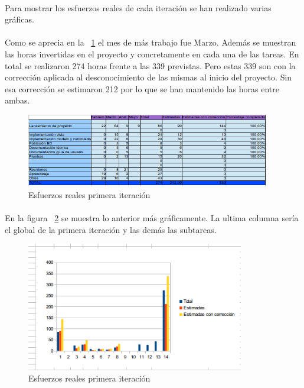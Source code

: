 
\paragraph{} Para mostrar los esfuerzos reales de cada iteración se han realizado varias gráficas.

\paragraph{} Como se aprecia en la ~\cref{fig:6161} el mes de más trabajo fue Marzo. Además se muestran las horas invertidas en el proyecto y concretamente en cada una de las tareas. En total se realizaron 274 horas frente a las 339 previstas. Pero estas 339 son con la corrección aplicada al desconocimiento de las mismas al inicio del proyecto. Sin esa corrección se estimaron 212 por lo que se han mantenido las horas entre ambas.

\begin{figure}[h!]
\centering
\includegraphics[width=0.95\textwidth]{img/6161}
\caption{Esfuerzos reales primera iteración}
 \label{fig:6161}
\end{figure}

\paragraph{} En la figura ~\cref{fig:6162} se muestra lo anterior más gráficamente. La ultima columna sería el global de la primera iteración y las demás las subtareas.

\begin{figure}[h!]
\centering
\includegraphics[width=0.85\textwidth]{img/6162}
\caption{Esfuerzos reales primera iteración}
 \label{fig:6162}
\end{figure}



